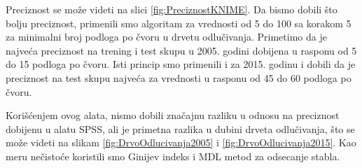 \documentclass[a4paper]{article}
\begin{document}
Preciznost se može videti na slici \ref{fig:PreciznostKNIME}.
Da bismo dobili što bolju preciznost, primenili smo algoritam za vrednosti od 5 do 100 sa korakom 5 za minimalni broj podloga po čvoru u drvetu odlučivanja.
Primetimo da je najveća preciznost na trening i test skupu u 2005. godini dobijena u rasponu od 5 do 15 podloga po čvoru.
Isti princip smo primenili i za 2015. godinu i dobili da je preciznost na test skupu najveća za vrednosti u rasponu od 45 do 60 podloga po čvoru.

Korišćenjem ovog alata, nismo dobili značajnu razliku u odnosu na preciznost dobijenu u alatu SPSS, ali je primetna razlika u dubini drveta odlučivanja, što se može videti na slikam \ref{fig:DrvoOdlucivanja2005} i \ref{fig:DrvoOdlucivanja2015}. Kao meru nečistoće koristili smo Ginijev indeks i MDL metod za odsecanje stabla.
\end{document}
